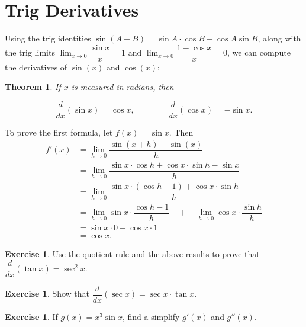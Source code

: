 \documentclass[11pt,reqno,final]{amsart}
\numberwithin{figure}{section}
\newtheorem{theorem}[equation]{Theorem}%
\theoremstyle{definition} %
\newtheorem{exercise}[question]{Exercise}
\newcommand{\dlim}{\displaystyle\lim}
\begin{document}
\newpage

\section{Trig Derivatives}

Using the trig identities $\sin(A+B) = \sin A \cdot \cos B + \cos A \sin B$,
along with the trig limits $\dlim_{x \to 0}\dfrac{\sin x}{x} = 1$ and $\dlim_{x \to 0}\dfrac{1 - \cos x}{x} = 0$,
we can compute the derivatives of $\sin(x)$ and $\cos(x)$:

\begin{theorem}
        If $x$ is measured in radians, then
        \begin{framed}
                \[
                        \dfrac{d}{dx}(\sin x) = \cos x,
                        \qquad \qquad
                        \dfrac{d}{dx}(\cos x) = -\sin x.
                        \]
        \end{framed}
\end{theorem}

To prove the first formula, let $f(x) = \sin x$. Then
\begin{align*}
  f'(x) &= \dlim_{h \to 0} \dfrac{\sin(x+h) - \sin(x)}{h}\\
        &= \dlim_{h \to 0} \dfrac{\sin x \cdot \cos h + \cos x \cdot \sin h - \sin x}{h}\\
        &= \dlim_{h \to 0} \dfrac{ \sin x \cdot (\cos h - 1) + \cos x \cdot \sin h}{h}\\
        &= \dlim_{h \to 0} \sin x \cdot \dfrac{\cos h - 1}{h} \quad + \quad \dlim_{h \to 0} \cos x \cdot \dfrac{\sin h}{h}\\
        &= \sin x \cdot 0 + \cos x \cdot 1\\
        &= \cos x.          
\end{align*}

\begin{exercise}
        Use the quotient rule and the above results to prove that $\dfrac{d}{dx}(\tan x) = \sec^2 x$.
        \vfill
\end{exercise}

\begin{exercise}
        Show that $\dfrac{d}{dx}(\sec x) = \sec x \cdot \tan x$.
        \vfill
\end{exercise}

\begin{exercise}
        If $g(x) = x^3 \sin x$, find a simplify $g'(x)$ and $g''(x)$.
        \vfill
\end{exercise}
\end{document}
